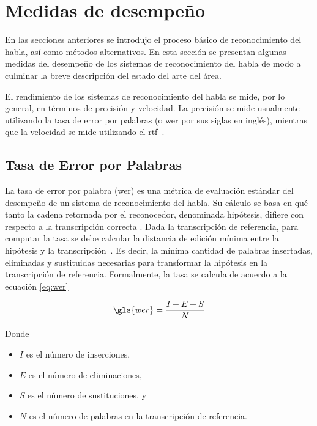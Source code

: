 \section{Medidas de desempe\~no}
\label{sec:medidas-desempenho}

En las secciones anteriores se introdujo el proceso b\'asico de reconocimiento del habla, 
as\'i como m\'etodos alternativos. En esta secci\'on se presentan algunas medidas del desempe\~no 
de los sistemas de reconocimiento del habla de modo a culminar la breve descripci\'on del estado 
del arte del \'area.

El rendimiento de los sistemas de reconocimiento del habla se mide, por lo general, en t\'erminos
de precisi\'on y velocidad. La precisi\'on se mide usualmente utilizando la tasa de error por palabras
(o \gls{wer} por sus siglas en ingl\'es), mientras que la velocidad se mide utilizando el 
\mbox{\gls{rtf} \cite{GaikwadAReview2010}.}

\subsection{Tasa de Error por Palabras}
\label{sec:wer}

La tasa de error por palabra (\gls{wer}) es una m\'etrica de evaluaci\'on est\'andar del desempe\~no de un sistema de
reconocimiento del habla. Su c\'alculo se basa en qu\'e tanto la cadena retornada por el reconocedor,
denominada hip\'otesis, difiere con respecto a la transcripci\'on correcta \cite{Jurafsky}. 
Dada la transcripci\'on de referencia, para computar la tasa se debe calcular la distancia de edici\'on m\'inima
entre la hip\'otesis y la \mbox{transcripci\'on \cite{GaikwadAReview2010}}. Es decir, la m\'inima cantidad 
de palabras insertadas, eliminadas y sustituidas necesarias para transformar la hipótesis en la 
transcripción de referencia. Formalmente, la tasa se calcula de acuerdo a la ecuaci\'on \eqref{eq:wer}

\begin{equation}
\label{eq:wer}
    \gls{wer} = \frac{I + E + S}{N} 
\end{equation}

Donde

\begin{itemize}
    \item $I$ es el n\'umero de inserciones,
    \item $E$ es el n\'umero de eliminaciones,
    \item $S$ es el n\'umero de sustituciones, y
    \item $N$ es el n\'umero de palabras en la transcripci\'on de referencia.
\end{itemize}

